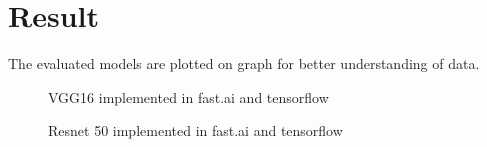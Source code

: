 \documentclass[11pt]{article}
\begin{document}
	\section[result]{Result}%
	\label{sec:result}

	The evaluated models are plotted on graph for better understanding of data.

	\begin{figure}[H]
		\centering
		\hspace{0.5cm}
		\caption{VGG16 implemented in fast.ai and tensorflow}
		\label{VGG16 in fast.ai and tensorflow}
	\end{figure}


	\begin{figure}[H]
		\centering
		\hspace{0.5cm}
		\caption{Resnet 50 implemented in fast.ai and tensorflow}
		\label{ResNet 50 in fast.ai and tensorflow}
	\end{figure}
\end{document}
